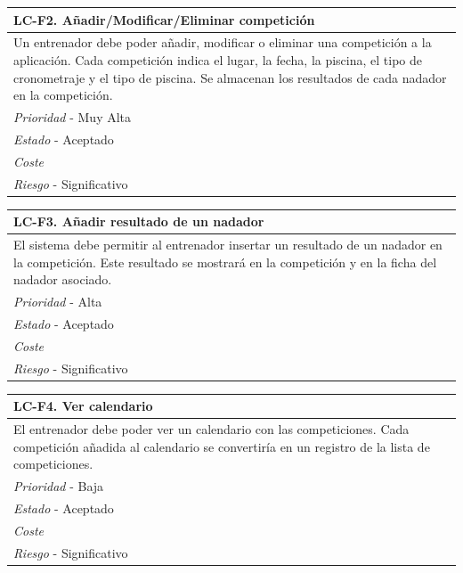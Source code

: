 	\begin{center}
		\begin{tabularx}{15cm}{|X|}
			\hline 
				\bf{LC-F2. Añadir/Modificar/Eliminar competición }\\
			\hline
				Un entrenador debe poder añadir, modificar o eliminar una competición a la aplicación. Cada competición indica el lugar, la fecha, la piscina, el tipo de cronometraje y el tipo de piscina. Se almacenan los resultados de cada nadador en la competición.\\
			\hline
				{\it Prioridad} - Muy Alta\\
			\hline
				{\it Estado} - Aceptado\\
			\hline
				{\it Coste}\\
			\hline
				{\it Riesgo} - Significativo\\
			\hline
		\end{tabularx}
	\end{center}
	
	\begin{center}
		\begin{tabularx}{15cm}{|X|}
			\hline 
				\bf{LC-F3. Añadir resultado de un nadador }\\
			\hline
				El sistema debe permitir al entrenador insertar un resultado de un nadador en la competición. Este resultado se mostrará en la competición y en la ficha del nadador asociado.\\
			\hline
				{\it Prioridad} - Alta\\
			\hline
				{\it Estado} - Aceptado\\
			\hline
				{\it Coste}\\
			\hline
				{\it Riesgo} - Significativo\\
			\hline
		\end{tabularx}
	\end{center}
	
	\begin{center}
		\begin{tabularx}{15cm}{|X|}
			\hline 
				\bf{LC-F4. Ver calendario}\\
			\hline
				El entrenador debe poder ver un calendario con las competiciones. Cada competición añadida al calendario se convertiría en un registro de la lista de competiciones.\\
			\hline
				{\it Prioridad} - Baja\\
			\hline
				{\it Estado} - Aceptado\\
			\hline
				{\it Coste}\\
			\hline
				{\it Riesgo} - Significativo\\
			\hline
		\end{tabularx}
	\end{center}
	
